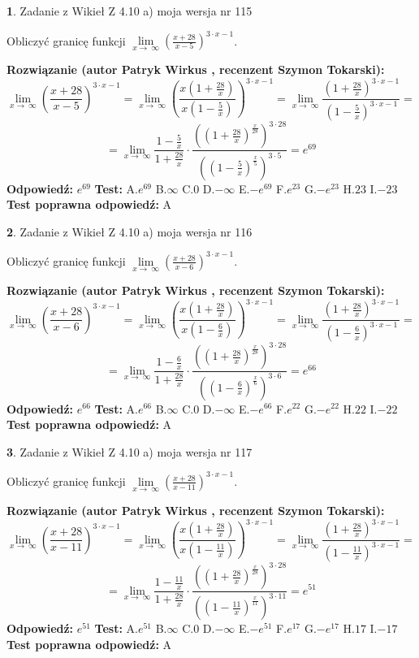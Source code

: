 \documentclass[12pt, a4paper]{article}
\theoremstyle{definition} %
\newtheorem{zad}{}
\newcommand{\zadStart}[1]{\begin{zad}#1\newline}
\newcommand{\zadStop}{\end{zad}}
\newcommand{\rozwStart}[2]{\noindent \textbf{Rozwiązanie (autor #1 , recenzent #2): }\newline}
\newcommand{\rozwStop}{\newline}
\newcommand{\odpStart}{\noindent \textbf{Odpowiedź:}\newline}
\newcommand{\odpStop}{\newline}
\newcommand{\testStart}{\noindent \textbf{Test:}\newline}
\newcommand{\testStop}{\newline}
\newcommand{\kluczStart}{\noindent \textbf{Test poprawna odpowiedź:}\newline}
\newcommand{\kluczStop}{\newline}
\begin{document}
\zadStart{Zadanie z Wikieł Z 4.10 a) moja wersja nr 115}

Obliczyć granicę funkcji  $\lim\limits_{x\to\ \infty}(\frac{x+28}{x-5})^{3\cdot x-1}$.
\zadStop
\rozwStart{Patryk Wirkus}{Szymon Tokarski}
$$\lim\limits_{x\to\ \infty}(\frac{x+28}{x-5})^{3\cdot x-1} = \lim\limits_{x\to\ \infty}(\frac{x(1+\frac{28}{x})}{x(1-\frac{5}{x})})^{3\cdot x-1}=\lim\limits_{x\to\ \infty}\frac{(1+\frac{28}{x})^{3\cdot x-1}}{(1-\frac{5}{x})^{3\cdot x-1}}=$$
$$=\lim\limits_{x\to\ \infty}\frac{1-\frac{5}{x}}{1+\frac{28}{x}}\cdot\frac{((1+\frac{28}{x})^{\frac{x}{28}})^{3\cdot28}}{((1-\frac{5}{x})^{\frac{x}{5}})^{3\cdot5}}=e^{69}$$
\rozwStop
\odpStart
$e^{69}$
\odpStop
\testStart
A.$e^{69}$ B.$\infty$ C.$0$ D.$-\infty$ E.$-e^{69}$
F.$e^{23}$ G.$-e^{23}$
H.$23$
I.$-23$
\testStop
\kluczStart
A
\kluczStop



\zadStart{Zadanie z Wikieł Z 4.10 a) moja wersja nr 116}

Obliczyć granicę funkcji  $\lim\limits_{x\to\ \infty}(\frac{x+28}{x-6})^{3\cdot x-1}$.
\zadStop
\rozwStart{Patryk Wirkus}{Szymon Tokarski}
$$\lim\limits_{x\to\ \infty}(\frac{x+28}{x-6})^{3\cdot x-1} = \lim\limits_{x\to\ \infty}(\frac{x(1+\frac{28}{x})}{x(1-\frac{6}{x})})^{3\cdot x-1}=\lim\limits_{x\to\ \infty}\frac{(1+\frac{28}{x})^{3\cdot x-1}}{(1-\frac{6}{x})^{3\cdot x-1}}=$$
$$=\lim\limits_{x\to\ \infty}\frac{1-\frac{6}{x}}{1+\frac{28}{x}}\cdot\frac{((1+\frac{28}{x})^{\frac{x}{28}})^{3\cdot28}}{((1-\frac{6}{x})^{\frac{x}{6}})^{3\cdot6}}=e^{66}$$
\rozwStop
\odpStart
$e^{66}$
\odpStop
\testStart
A.$e^{66}$ B.$\infty$ C.$0$ D.$-\infty$ E.$-e^{66}$
F.$e^{22}$ G.$-e^{22}$
H.$22$
I.$-22$
\testStop
\kluczStart
A
\kluczStop



\zadStart{Zadanie z Wikieł Z 4.10 a) moja wersja nr 117}

Obliczyć granicę funkcji  $\lim\limits_{x\to\ \infty}(\frac{x+28}{x-11})^{3\cdot x-1}$.
\zadStop
\rozwStart{Patryk Wirkus}{Szymon Tokarski}
$$\lim\limits_{x\to\ \infty}(\frac{x+28}{x-11})^{3\cdot x-1} = \lim\limits_{x\to\ \infty}(\frac{x(1+\frac{28}{x})}{x(1-\frac{11}{x})})^{3\cdot x-1}=\lim\limits_{x\to\ \infty}\frac{(1+\frac{28}{x})^{3\cdot x-1}}{(1-\frac{11}{x})^{3\cdot x-1}}=$$
$$=\lim\limits_{x\to\ \infty}\frac{1-\frac{11}{x}}{1+\frac{28}{x}}\cdot\frac{((1+\frac{28}{x})^{\frac{x}{28}})^{3\cdot28}}{((1-\frac{11}{x})^{\frac{x}{11}})^{3\cdot11}}=e^{51}$$
\rozwStop
\odpStart
$e^{51}$
\odpStop
\testStart
A.$e^{51}$ B.$\infty$ C.$0$ D.$-\infty$ E.$-e^{51}$
F.$e^{17}$ G.$-e^{17}$
H.$17$
I.$-17$
\testStop
\kluczStart
A
\kluczStop
\end{document}
